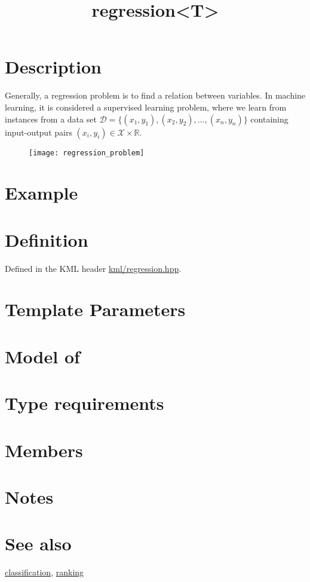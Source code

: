\documentclass{article}
\begin{document}
\title{regression<T>}
\maketitle

\section*{Description}

Generally, a regression problem is to find a relation between variables. 
In machine learning, it is considered a supervised learning problem, where we 
learn from instances from a data set 
$\mathcal{D}=\{ (x_1,y_1), (x_2,y_2), \ldots, (x_n, y_n ) \}$ 
containing input-output pairs $(x_i,y_i)\in \mathcal{X}\times \mathbb{R}$. 

\begin{figure}
\texttt{[image: regression\_problem]}
\end{figure}

\section*{Example}
\section*{Definition}

Defined in the KML header \href{\kmlsvnroot/kml/regression.hpp}{kml/regression.hpp}.

\section*{Template Parameters}
\section*{Model of}
\section*{Type requirements}
\section*{Members}
\section*{Notes}
\section*{See also}

\href{\kmlroot/reference/classification.html}{classification}, 
\href{\kmlroot/reference/ranking.html}{ranking}



\end{document}
